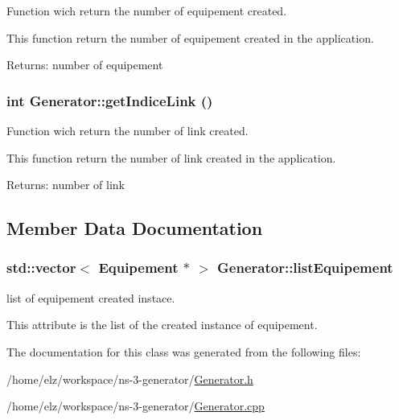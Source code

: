 Function wich return the number of equipement created. 

This function return the number of equipement created in the application.

\begin{Desc}
\item[Returns:]number of equipement \end{Desc}
\hypertarget{class_generator_05e1b6e209fb7730960de318fccaa86a}{
\subsubsection[{getIndiceLink}]{\setlength{\rightskip}{0pt plus 5cm}int Generator::getIndiceLink ()}}
\label{class_generator_05e1b6e209fb7730960de318fccaa86a}


Function wich return the number of link created. 

This function return the number of link created in the application.

\begin{Desc}
\item[Returns:]number of link \end{Desc}


\subsection{Member Data Documentation}
\hypertarget{class_generator_96d452a5ef951497a37baf86e35b50f6}{
\subsubsection[{listEquipement}]{\setlength{\rightskip}{0pt plus 5cm}std::vector$<$ {\bf Equipement} $\ast$ $>$ {\bf Generator::listEquipement}}}
\label{class_generator_96d452a5ef951497a37baf86e35b50f6}


list of equipement created instace. 

This attribute is the list of the created instance of equipement. 

The documentation for this class was generated from the following files:\begin{CompactItemize}
\item 
/home/elz/workspace/ns-3-generator/\hyperlink{_generator_8h}{Generator.h}\item 
/home/elz/workspace/ns-3-generator/\hyperlink{_generator_8cpp}{Generator.cpp}\end{CompactItemize}
